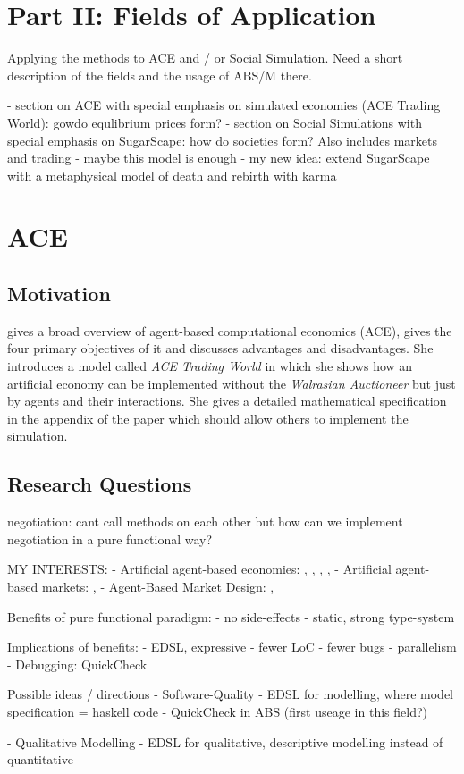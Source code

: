 \section{Part II: Fields of Application}
Applying the methods to ACE and / or Social Simulation. Need a short description of the fields and the usage of ABS/M there.

- section on ACE with special emphasis on simulated economies (ACE Trading World): gowdo equlibrium prices form?
- section on Social Simulations with special emphasis on SugarScape: how do societies form? Also includes markets and trading - maybe this model is enough
- my new idea: extend SugarScape with a metaphysical  model of death and rebirth with karma


\section{ACE}

\subsection{Motivation}
\cite{tesfatsion_agent-based_2006} gives a broad overview of agent-based computational economics (ACE), gives the four primary objectives of it and discusses advantages and disadvantages. She introduces a model called \textit{ACE Trading World} in which she shows how an artificial economy can be implemented without the \textit{Walrasian Auctioneer} but just by agents and their interactions. She gives a detailed mathematical specification in the appendix of the paper which should allow others to implement the simulation.

\subsection{Research Questions}
negotiation: cant call methods on each other but how can we implement negotiation in a pure functional way?

MY INTERESTS:
- Artificial agent-based economies: \cite{tesfatsion_agent-based_2006}, \cite{gintis_emergence_2006}, \cite{gintis_dynamics_2007}, \cite{gaffeo_adaptive_2008}, \cite{botta_functional_2011}
- Artificial agent-based markets: \cite{mackie-mason_chapter_2006}, \cite{darley_nasdaq_2007}
- Agent-Based Market Design: \cite{marks_chapter_2006}, \cite{budish_editors_2015}

Benefits of pure functional paradigm:
- no side-effects
- static, strong type-system

Implications of benefits:
- EDSL, expressive
- fewer LoC
- fewer bugs
- parallelism
- Debugging: QuickCheck

Possible ideas / directions
- Software-Quality
	- EDSL for modelling, where model specification = haskell code
	- QuickCheck in ABS (first useage in this field?)

- Qualitative Modelling
	- EDSL for qualitative, descriptive modelling instead of quantitative
